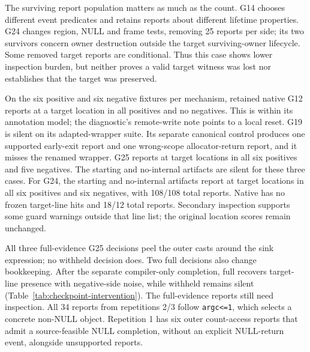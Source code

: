 The surviving report population matters as much as the count.
G14 chooses different event predicates and retains reports about different lifetime properties.
G24 changes region, NULL and frame tests, removing 25 reports per side; its two survivors concern owner destruction outside the target surviving-owner lifecycle.
Some removed target reports are conditional.
Thus this case shows lower inspection burden, but neither proves a valid target witness was lost nor establishes that the target was preserved.

On the six positive and six negative fixtures per mechanism, retained native G12 reports at a target location in all positives and no negatives.
This is within its annotation model; the diagnostic's remote-write note points to a local reset.
G19 is silent on its adapted-wrapper suite.
Its separate canonical control produces one supported early-exit report and one wrong-scope allocator-return report, and it misses the renamed wrapper.
G25 reports at target locations in all six positives and five negatives.
The starting and no-internal artifacts are silent for these three cases.
For G24, the starting and no-internal artifacts report at target locations in all six positives and six negatives, with 108/108 total reports.
Native has no frozen target-line hits and 18/12 total reports.
Secondary inspection supports some guard warnings outside that line list; the original location scores remain unchanged.

All three full-evidence G25 decisions peel the outer casts around the sink expression; no withheld decision does.
Two full decisions also change bookkeeping.
After the separate compiler-only completion, full recovers target-line presence with negative-side noise, while withheld remains silent (Table~\ref{tab:checkpoint-intervention}).
The full-evidence reports still need inspection.
All 34 reports from repetitions 2/3 follow \texttt{argc<=1}, which selects a concrete non-NULL object.
Repetition 1 has six outer count-access reports that admit a source-feasible NULL completion, without an explicit NULL-return event, alongside unsupported reports.

